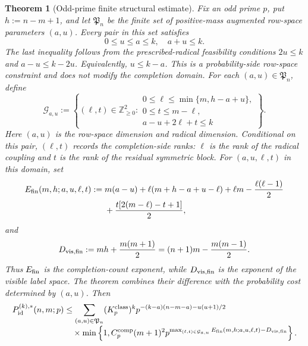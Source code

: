 \documentclass[11pt]{article}
\newcommand{\1}{\mathbf 1}
\theoremstyle{plain}
\newtheorem{theorem}{Theorem}[section]
\theoremstyle{definition}
\theoremstyle{remark}
\begin{document}
\begin{theorem}[Odd-prime finite structural estimate]
\label{thm:converse-odd-prime-finite-structural-estimate}
Fix an odd prime $p$, put $h:=n-m+1$, and let
$\mathfrak P_n$ be the finite set of positive-mass augmented row-space
parameters $(a,u)$.  Every pair in this set satisfies
\begin{equation}
 0\le u\le a\le k,\quad a+u\le k.
 \label{eq:theorem-B-positive-mass-domain}
\end{equation}
The last inequality follows from the prescribed-radical feasibility conditions
$2u\le k$ and $a-u\le k-2u$.  Equivalently, $u\le k-a$.  This is a
probability-side row-space constraint and does not modify the completion domain.  For each
$(a,u)\in\mathfrak P_n$, define
\begin{equation}
 \mathcal G_{a,u}:=
 \left\{(\ell,t)\in\mathbb Z_{\ge0}^2:
 \begin{array}{l}
 0\le\ell\le\min\{m,h-a+u\},\\
 0\le t\le m-\ell,\\
 a-u+2\ell+t\le k
 \end{array}\right\}.
 \label{eq:theorem-B-G-au}
\end{equation}
Here $(a,u)$ is the row-space dimension and radical dimension.  Conditional on this pair,
$(\ell,t)$ records the completion-side ranks: $\ell$ is the rank of the
radical coupling and $t$ is the rank of the residual symmetric block.
For $(a,u,\ell,t)$ in this domain, set
\begin{align}
 E_{\rm fin}(m,h;a,u,\ell,t)
 :={}&m(a-u)+\ell(m+h-a+u-\ell)
 +\ell m-\frac{\ell(\ell-1)}2\notag\\
 &+\frac{t[2(m-\ell)-t+1]}2,
 \label{eq:theorem-B-E-fin}
\end{align}
and
\begin{equation}
 D_{\rm vis,fin}:=mh+\frac{m(m+1)}2
 =(n+1)m-\frac{m(m-1)}2.
 \label{eq:theorem-B-D-vis-fin}
\end{equation}
Thus $E_{\rm fin}$ is the completion-count exponent, while
$D_{\rm vis,fin}$ is the exponent of the visible label space.  The theorem
combines their difference with the probability cost determined by $(a,u)$.
Then
\begin{align}
 P_{\mathrm{id}}^{(k),*}(n,m;p)
 &\le \sum_{(a,u)\in\mathfrak P_n}
 (K_p^{\mathrm{class}})^k
 p^{-(k-a)(n-m-a)-u(u+1)/2}
 \notag\\[-1mm]
 &\quad\times
 \min\left\{1,
 C_p^{\mathrm{comp}}(m+1)^2
 p^{\max_{(\ell,t)\in\mathcal G_{a,u}}
 E_{\rm fin}(m,h;a,u,\ell,t)-D_{\rm vis,fin}}\right\}.

\end{align}
\end{theorem}
\end{document}
